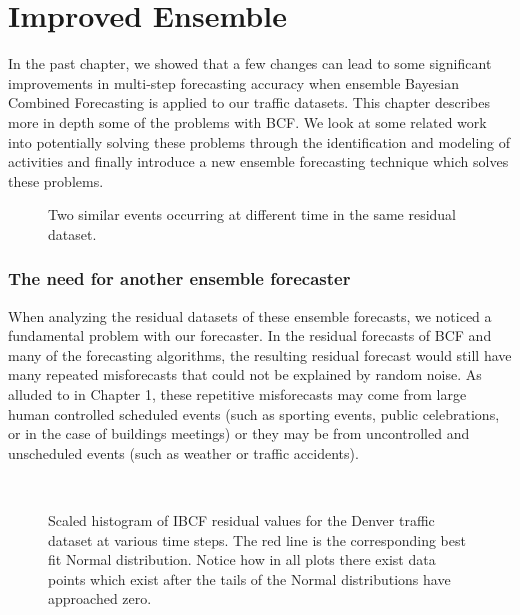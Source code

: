 \chapter{Improved Ensemble}
In the past chapter, we showed that a few changes can lead to some significant improvements in multi-step forecasting accuracy when ensemble Bayesian Combined Forecasting is applied to our traffic datasets.  This chapter describes more in depth some of the problems with BCF.  We look at some related work into potentially solving these problems through the identification and modeling of activities and finally introduce a new ensemble forecasting technique which solves these problems.  

\begin{figure}[!b]
	\begin{center}
	\end{center}
	\caption{Two similar events occurring at different time in the same residual dataset.}
	\label{fig:sample_residual_events}
\end{figure}


\subsection{The need for another ensemble forecaster}
When analyzing the residual datasets of these ensemble forecasts, we noticed a fundamental problem with our forecaster.  In the residual forecasts of BCF and many of the forecasting algorithms, the resulting residual forecast would still have many repeated misforecasts that could not be explained by random noise.  As alluded to in Chapter 1, these repetitive misforecasts may come from large human controlled scheduled events (such as sporting events, public celebrations, or in the case of buildings meetings) or they may be from uncontrolled and unscheduled events (such as weather or traffic accidents).  

\begin{figure}[!t]
	\begin{center}
		 \\
	\end{center}
	\caption{Scaled histogram of IBCF residual values for the Denver traffic dataset at various time steps.  The red line is the corresponding best fit Normal distribution.  Notice how in all plots there exist data points which exist after the tails of the Normal distributions have approached zero.}
	\label{fig:denver_bcf_residual}
\end{figure}

